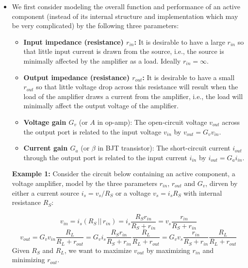 \begin{itemize}
\begin{itemize}
\item We first consider modeling the overall function and performance of 
  an active component (instead of its internal structure and implementation
  which may be very complicated) by the following three parameters:
  \begin{itemize}
  \item {\bf Input impedance (resistance) $r_{in}$:} It is desirable to have
    a large $r_{in}$ so that little input current is drawn from the source, 
    i.e., the source is minimally affected by the amplifier as a load. 
    Ideally $r_{in}=\infty$. 
  \item {\bf Output impedance (resistance) $r_{out}$:} It is desirable to 
    have a small $r_{out}$ so that little voltage drop across this resistance 
    will result when the load of the amplifier draws a current from the 
    amplifier, i.e., the load will minimally affect the output voltage of 
    the amplifier.
  \item {\bf Voltage gain $G_v$} (or $A$ in op-amp):
    The open-circuit voltage $v_{out}$ across the output port is related 
    to the input voltage $v_{in}$ by $v_{out}=G_v v_{in}$.
  \item {\bf Current gain $G_a$} (or $\beta$ in BJT transistor):
    The short-circuit current $i_{out}$ through the output port is related 
    to the input current $i_{in}$ by $i_{out}=G_a i_{in}$.
  \end{itemize}
  


  {\bf Example 1:} Consider the circuit below containing an active component,
  a voltage amplifier, model by the three parameters $r_{in}$, $r_{out}$ and 
  $G_v$, dirven by either a current source $i_s=v_s/R_S$ or a voltage $v_s=i_sR_S$ 
  with internal resistance $R_S$:


  \[
  v_{in}=i_s (R_S \,||\, r_{in})=i_s \frac{R_S r_{in}}{R_S+r_{in}} 
  =v_s \frac{r_{in}}{R_S+r_{in}} 
  \]
  \[
  v_{out}=G_v v_{in} \frac{R_L}{R_L+r_{out}}
  =G_v i_s \frac{R_S r_{in}}{R_S+r_{in}} \frac{R_L}{R_L+r_{out}} 
  =G_v v_s \frac{r_{in}}{R_S+r_{in}} \frac{R_L}{R_L+r_{out}} 
  \]
  Given $R_S$ and $R_L$, we want to maximize $v_{out}$ by
  maximizing $r_{in}$ and minimizing $r_{out}$.


\end{itemize}
\end{itemize}
